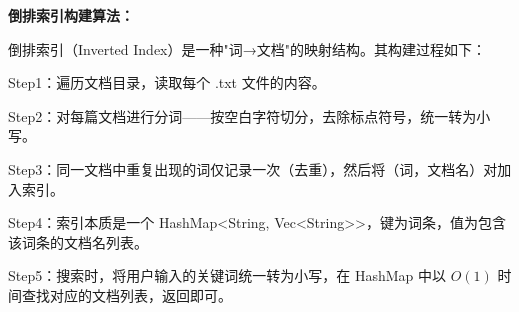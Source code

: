 \noindent\textbf{倒排索引构建算法：}\par
\noindent\hspace*{2em}倒排索引（Inverted Index）是一种"词→文档"的映射结构。其构建过程如下：\par
\noindent\hspace*{2em}Step1：遍历文档目录，读取每个 .txt 文件的内容。\par
\noindent\hspace*{2em}Step2：对每篇文档进行分词——按空白字符切分，去除标点符号，统一转为小写。\par
\noindent\hspace*{2em}Step3：同一文档中重复出现的词仅记录一次（去重），然后将（词，文档名）对加入索引。\par
\noindent\hspace*{2em}Step4：索引本质是一个 HashMap<String, Vec<String>>，键为词条，值为包含该词条的文档名列表。\par
\noindent\hspace*{2em}Step5：搜索时，将用户输入的关键词统一转为小写，在 HashMap 中以 $O(1)$ 时间查找对应的文档列表，返回即可。\par


